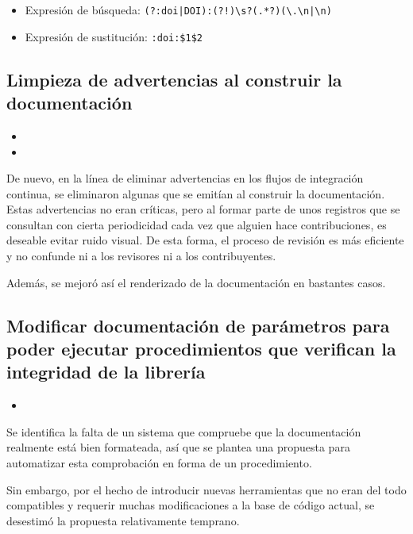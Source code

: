 \begin{itemize}
    \item Expresión de búsqueda: \texttt{(?:doi|DOI):(?!\textasciigrave{})\textbackslash s?(.*?)(\textbackslash .\textbackslash n|\textbackslash n)}
\end{itemize}
\begin{itemize}
    \item Expresión de sustitución: \texttt{:doi:\textasciigrave{}\$1\textasciigrave{}\$2}
\end{itemize}

\subsection{Limpieza de advertencias al construir la documentación}

\begin{itemize}
    \item {}
    \item {}
\end{itemize}

De nuevo, en la línea de eliminar advertencias en los flujos de integración continua, se eliminaron algunas que se emitían al construir la documentación. Estas advertencias no eran críticas, pero al formar parte de unos registros que se consultan con cierta periodicidad cada vez que alguien hace contribuciones, es deseable evitar ruido visual. De esta forma, el proceso de revisión es más eficiente y no confunde ni a los revisores ni a los contribuyentes.

Además, se mejoró así el renderizado de la documentación en bastantes casos.

\subsection{Modificar documentación de parámetros para poder ejecutar procedimientos que verifican la integridad de la librería}

\begin{itemize}
    \item {}
\end{itemize}

Se identifica la falta de un sistema que compruebe que la documentación realmente está bien formateada, así que se plantea una propuesta para automatizar esta comprobación en forma de un procedimiento.

Sin embargo, por el hecho de introducir nuevas herramientas que no eran del todo compatibles y requerir muchas modificaciones a la base de código actual, se desestimó la propuesta relativamente temprano.

